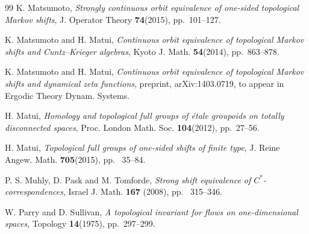 \documentclass[11pt]{article}
\theoremstyle{plain}
\theoremstyle{definition}
\numberwithin{equation}{section}
\begin{document}
\begin{thebibliography}{99}
{\sc K. Matsumoto},
{\it Strongly continuous orbit equivalence of 
one-sided topological Markov shifts},
J. Operator Theory 
{\bf 74}(2015), pp.\ 101--127.

{\sc K. Matsumoto and H. Matui},
{\it Continuous orbit equivalence of topological Markov shifts 
and Cuntz--Krieger algebras},
Kyoto J. Math.
{\bf 54}(2014), pp.\ 863--878.


{\sc K. Matsumoto and H. Matui},
{\it Continuous orbit equivalence of topological Markov shifts 
and dynamical zeta functions}, preprint, arXiv:1403.0719,
to appear in Ergodic Theory Dynam. Systems.




{\sc H. Matui}, 
{\it Homology and topological full groups of {\'e}tale groupoids on totally disconnected spaces},
 Proc. London Math. Soc. {\bf 104}(2012), 
 pp.\ 27--56.

{\sc H. Matui}, 
{\it Topological full groups of one-sided shifts of finite type},
J. Reine Angew. Math.
{\bf 705}(2015), pp. \ 35--84.





{\sc P. S. Muhly, D.  Pask and M. Tomforde},
{\it Strong shift equivalence of $C^*$-correspondences},
Israel J. Math. {\bf 167} (2008), pp. \ 315--346. 


{\sc W. Parry and D. Sullivan},
{\it A topological invariant for flows on one-dimensional spaces},
Topology
 {\bf 14}(1975), pp.\ 297--299.








\end{thebibliography}
\end{document}
